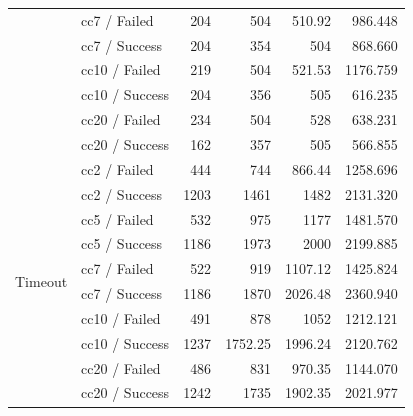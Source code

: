 \begin{table}[htbp]
\begin{tabular}{llrrrr}
		& cc7 / Failed
		& 204 & 504 & 510.92 & 986.448 \\
		& cc7 / Success
		& 204 & 354 & 504 & 868.660 \\

		& cc10 / Failed
		& 219 & 504 & 521.53 & 1176.759 \\
		& cc10 / Success
		& 204 & 356 & 505 & 616.235 \\

		& cc20 / Failed
		& 234 & 504 & 528 & 638.231 \\
		& cc20 / Success
		& 162 & 357 & 505 & 566.855 \\

		\midrule

		\multirow{10}{*}{Timeout}
		& cc2 / Failed
		& 444 & 744 & 866.44 & 1258.696 \\
		& cc2 / Success
		& 1203 & 1461 & 1482 & 2131.320 \\

		& cc5 / Failed
		& 532 & 975 & 1177 & 1481.570 \\
		& cc5 / Success
		& 1186 & 1973 & 2000 & 2199.885 \\

		& cc7 / Failed
		& 522 & 919 & 1107.12 & 1425.824 \\
		& cc7 / Success
		& 1186 & 1870 & 2026.48 & 2360.940 \\

		& cc10 / Failed
		& 491 & 878 & 1052 & 1212.121 \\
		& cc10 / Success
		& 1237 & 1752.25 & 1996.24 & 2120.762 \\

		& cc20 / Failed
		& 486 & 831 & 970.35 & 1144.070 \\
		& cc20 / Success
		& 1242 & 1735 & 1902.35 & 2021.977 \\

		\bottomrule
	\end{tabular}
\end{table}